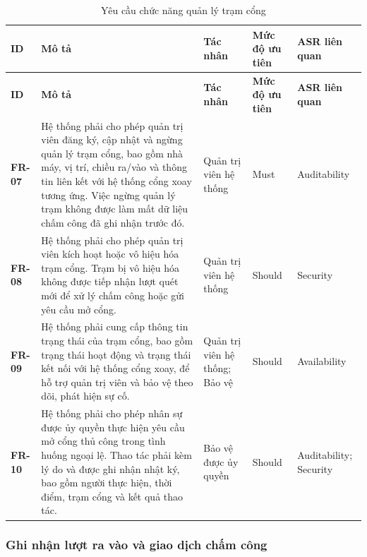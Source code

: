\begingroup
\small
\renewcommand{\arraystretch}{1.2}
\begin{longtable}{|>{\centering\arraybackslash}m{1.3cm}|>{\raggedright\arraybackslash}m{6.2cm}|>{\raggedright\arraybackslash}m{2.4cm}|>{\centering\arraybackslash}m{1.5cm}|>{\raggedright\arraybackslash}m{3.5cm}|}
    \caption{Yêu cầu chức năng quản lý trạm cổng}\label{tab:functional-requirements-gates}\\
    \hline
    \textbf{ID} & \textbf{Mô tả} & \textbf{Tác nhân} & \textbf{Mức độ ưu tiên} & \textbf{ASR liên quan}\\
    \hline
    \endfirsthead
    \hline
    \textbf{ID} & \textbf{Mô tả} & \textbf{Tác nhân} & \textbf{Mức độ ưu tiên} & \textbf{ASR liên quan}\\
    \hline
    \endhead
    \hline
    \endfoot
    \hline
    \endlastfoot
    \textbf{FR-07} & Hệ thống phải cho phép quản trị viên đăng ký, cập nhật và ngừng quản lý trạm cổng, bao gồm nhà máy, vị trí, chiều ra/vào và thông tin liên kết với hệ thống cổng xoay tương ứng. Việc ngừng quản lý trạm không được làm mất dữ liệu chấm công đã ghi nhận trước đó. & Quản trị viên hệ thống & Must & Auditability\\
    \hline
    \textbf{FR-08} & Hệ thống phải cho phép quản trị viên kích hoạt hoặc vô hiệu hóa trạm cổng. Trạm bị vô hiệu hóa không được tiếp nhận lượt quét mới để xử lý chấm công hoặc gửi yêu cầu mở cổng. & Quản trị viên hệ thống & Should & Security\\
    \hline
    \textbf{FR-09} & Hệ thống phải cung cấp thông tin trạng thái của trạm cổng, bao gồm trạng thái hoạt động và trạng thái kết nối với hệ thống cổng xoay, để hỗ trợ quản trị viên và bảo vệ theo dõi, phát hiện sự cố. & Quản trị viên hệ thống; Bảo vệ & Should & Availability\\
    \hline
    \textbf{FR-10} & Hệ thống phải cho phép nhân sự được ủy quyền thực hiện yêu cầu mở cổng thủ công trong tình huống ngoại lệ. Thao tác phải kèm lý do và được ghi nhận nhật ký, bao gồm người thực hiện, thời điểm, trạm cổng và kết quả thao tác. & Bảo vệ được ủy quyền & Should & Auditability; Security\\
    \hline
\end{longtable}
\endgroup

\subsubsection{Ghi nhận lượt ra vào và giao dịch chấm công}


